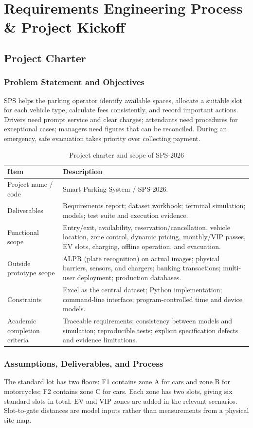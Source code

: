 \chapter{Requirements Engineering Process \& Project Kickoff}
\section{Project Charter}
\subsection{Problem Statement and Objectives}
SPS helps the parking operator identify available spaces, allocate a suitable slot for each vehicle type, calculate fees consistently, and record important actions. Drivers need prompt service and clear charges; attendants need procedures for exceptional cases; managers need figures that can be reconciled. During an emergency, safe evacuation takes priority over collecting payment.

\begin{table}[H]\centering\small
\caption{Project charter and scope of SPS-2026}
\begin{tabularx}{\linewidth}{L{32mm}X}\toprule
Item & Description\\\midrule
Project name / code & Smart Parking System / SPS-2026.\\
Deliverables & Requirements report; dataset workbook; terminal simulation; models; test suite and execution evidence.\\
Functional scope & Entry/exit, availability, reservation/cancellation, vehicle location, zone control, dynamic pricing, monthly/VIP passes, EV slots, charging, offline operation, and evacuation.\\
Outside prototype scope & ALPR (plate recognition) on actual images; physical barriers, sensors, and chargers; banking transactions; multi-user deployment; production databases.\\
Constraints & Excel as the central dataset; Python implementation; command-line interface; program-controlled time and device models.\\
Academic completion criteria & Traceable requirements; consistency between models and simulation; reproducible tests; explicit specification defects and evidence limitations.\\\bottomrule
\end{tabularx}\end{table}

\subsection{Assumptions, Deliverables, and Process}
The standard lot has two floors: F1 contains zone A for cars and zone B for motorcycles; F2 contains zone C for cars. Each zone has two slots, giving six standard slots in total. EV and VIP zones are added in the relevant scenarios. Slot-to-gate distances are model inputs rather than measurements from a physical site map.

